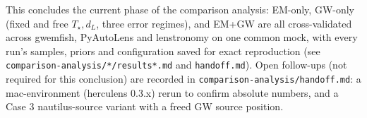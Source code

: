 \documentclass[10pt]{article}
\begin{document}
This concludes the current phase of the comparison analysis: EM-only, GW-only (fixed and free
$T_\star,d_L$, three error regimes), and EM+GW are all cross-validated across gwemfish, PyAutoLens
and lenstronomy on one common mock, with every run's samples, priors and configuration saved for
exact reproduction (see \texttt{comparison-analysis/*/results*.md} and \texttt{handoff.md}).
Open follow-ups (not required for this conclusion) are recorded in
\texttt{comparison-analysis/handoff.md}: a mac-environment (herculens 0.3.x) rerun to confirm
absolute numbers, and a Case 3 nautilus-source variant with a freed GW source position.
\end{document}
